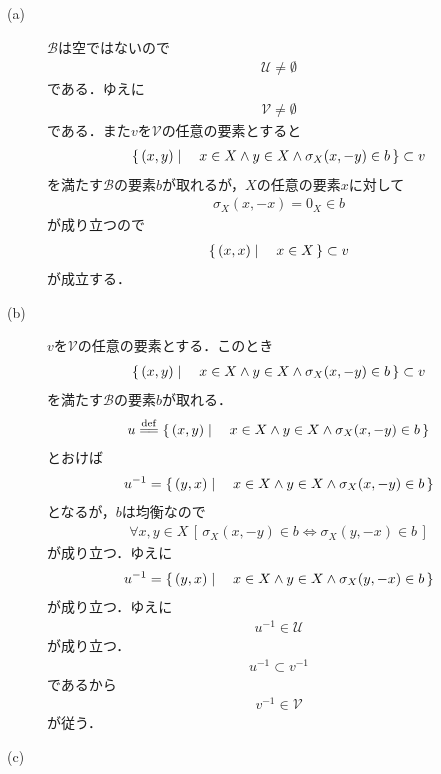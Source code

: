 	\begin{description}
		\item[(a)] $\mathscr{B}$は空ではないので
			\begin{align}
				\mathscr{U} \neq \emptyset
			\end{align}
			である．ゆえに
			\begin{align}
				\mathscr{V} \neq \emptyset
			\end{align}
			である．また$v$を$\mathscr{V}$の任意の要素とすると
			\begin{align}
				\left\{\, (x,y) \mid \quad x \in X \wedge y \in X \wedge \sigma_X(x,-y) \in b\, \right\} \subset v
			\end{align}
			を満たす$\mathscr{B}$の要素$b$が取れるが，$X$の任意の要素$x$に対して
			\begin{align}
				\sigma_X(x,-x) = 0_X \in b
			\end{align}
			が成り立つので
			\begin{align}
				\left\{\, (x,x) \mid \quad x \in X\, \right\} \subset v
			\end{align}
			が成立する．
			
		\item[(b)] $v$を$\mathscr{V}$の任意の要素とする．このとき
			\begin{align}
				\left\{\, (x,y) \mid \quad x \in X \wedge y \in X \wedge \sigma_X(x,-y) \in b\, \right\} \subset v
			\end{align}
			を満たす$\mathscr{B}$の要素$b$が取れる．
			\begin{align}
				u \defeq \Set{(x,y)}{x \in X \wedge y \in X \wedge \sigma_X(x,-y) \in b}
			\end{align}
			とおけば
			\begin{align}
				u^{-1} = \left\{\, (y,x) \mid \quad x \in X \wedge y \in X \wedge \sigma_X(x,-y) \in b\, \right\}
			\end{align}
			となるが，$b$は均衡なので
			\begin{align}
				\forall x,y \in X\, \left[\, \sigma_X(x,-y) \in b \Longleftrightarrow \sigma_X(y,-x) \in b\, \right]
			\end{align}
			が成り立つ．ゆえに
			\begin{align}
				u^{-1} = \left\{\, (y,x) \mid \quad x \in X \wedge y \in X \wedge \sigma_X(y,-x) \in b\, \right\}
			\end{align}
			が成り立つ．ゆえに
			\begin{align}
				u^{-1} \in \mathscr{U}
			\end{align}
			が成り立つ．
			\begin{align}
				u^{-1} \subset v^{-1}
			\end{align}
			であるから
			\begin{align}
				v^{-1} \in \mathscr{V}
			\end{align}
			が従う．
			
		\item[(c)] 
	\end{description}
	
